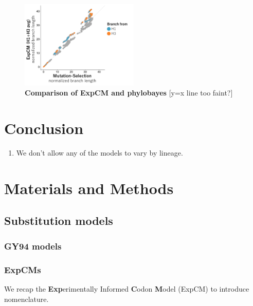 \documentclass[11pt]{article}
\newcommand\skhcomment[1]{{\color{cyan}[#1]}}
\begin{document}
\begin{figure}[H]
\centerline{\includegraphics[width=0.5\textwidth]{figures/phylobayes.pdf}}
\caption{\label{fig:phylobayes}
\textbf{Comparison of ExpCM and phylobayes}
\skhcomment{y=x line too faint?}
}
\end{figure}

\section*{Conclusion}

\begin{enumerate}
  \item We don't allow any of the models to vary by lineage. 
\end{enumerate}

\newpage
\section*{Materials and Methods}

\subsection*{Substitution models}
\subsubsection*{GY94 models}
\subsubsection*{ExpCMs}
We recap the \textbf{Exp}erimentally Informed \textbf{C}odon \textbf{M}odel (ExpCM) \citep{bloom2014experimentally,bloom2014informed,bloom2017identification,hilton2017phydms} to introduce nomenclature. 
\end{document}
